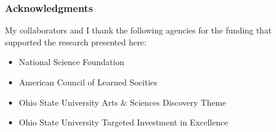 \documentclass[pdf,xcolor=table,envcountsect,handout]{beamer}
\begin{document}
\begin{frame}
\frametitle{Acknowledgments}

My collaborators and I thank the following agencies for the funding that supported the research presented here:

\begin{itemize}

\item National Science Foundation

\item American Council of Learned Socities

\item Ohio State University Arts \& Sciences Discovery Theme

\item Ohio State University Targeted Investment in Excellence

\end{itemize}

\end{frame}

\begin{tiny}




\end{tiny}
\end{document}
